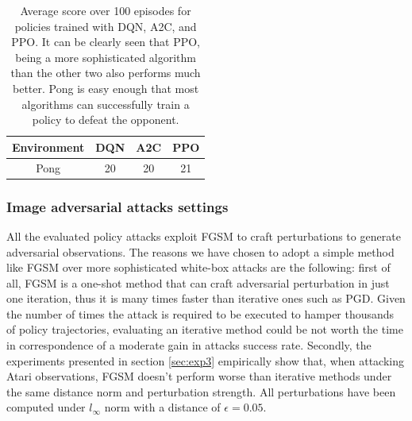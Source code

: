 \begin{table}
  \centering
  \caption{Average score over 100 episodes for policies trained with DQN, A2C, and PPO. It can be clearly seen that PPO, being a more sophisticated algorithm than the other two also performs much better. Pong is easy enough that most algorithms can successfully train a policy to defeat the opponent.}
  \begin{tabular}{cccc}
    \toprule
    Environment & DQN & A2C & PPO \\
    \midrule
    Pong & 20 & 20 & 21 \\ 
    \bottomrule
  \end{tabular}
  \label{table:2}
\end{table}

\subsubsection{Image adversarial attacks settings}
All the evaluated policy attacks exploit FGSM to craft perturbations to generate adversarial observations. The reasons we have chosen to adopt a simple method like FGSM over more sophisticated white-box attacks are the following: first of all, FGSM is a one-shot method that can craft adversarial perturbation in just one iteration, thus it is many times faster than iterative ones such as PGD. Given the number of times the attack is required to be executed to hamper thousands of policy trajectories, evaluating an iterative method could be not worth the time in correspondence of a moderate gain in attacks success rate. Secondly, the experiments presented in section \ref{sec:exp3} empirically show that, when attacking Atari observations, FGSM doesn't perform worse than iterative methods under the same distance norm and perturbation strength. All perturbations have been computed under \(l_\infty\) norm with a distance of \(\epsilon=0.05\).

